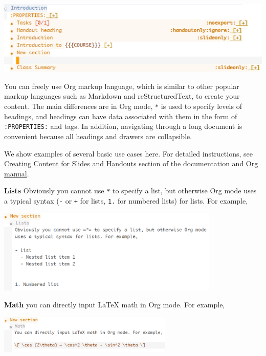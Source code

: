\documentclass[10pt,article]{article}
\begin{document}
\begin{center}
\includegraphics[height=3.5cm]{../../../Assets/Images/Org-Teaching/Quickstart_Lecture-Editing_New_Section.png}
\end{center}

You can freely use Org markup language, which is similar to other popular
markup languages such as Markdown and reStructuredText, to create your
content. The main differences are in Org mode, \texttt{*} is used to specify levels
of headings, and headings can have data associated with them in the form of
\texttt{:PROPERTIES:} and tags. In addition, navigating through a long document is 
convenient because all headings and drawers are collapsible. 

We show examples of several basic use cases here. For detailed instructions,
see \href{https://joonro.github.io/Org-Coursepack/Lectures/04\%2520Creating\%2520Content\%2520for\%2520Slides\%2520and\%2520Handouts.html}{Creating Content for Slides and Handouts} section of the documentation and
\href{https://orgmode.org/manual/index.html}{Org manual}.

\textbf{Lists} Obviously you cannot use \texttt{*} to specify a list, but otherwise Org mode
uses a typical syntax (\texttt{-} or \texttt{+} for lists, \texttt{1.} for numbered lists) for
lists. For example,

\begin{center}
\includegraphics[height=4cm]{../../../Assets/Images/Org-Teaching/Quickstart_Lecture-Editing_Lists.png}
\end{center}

\textbf{Math} you can directly input \LaTeX{} math in Org mode. For example,

\begin{center}
\includegraphics[height=1.8cm]{../../../Assets/Images/Org-Teaching/Quickstart_Lecture-Editing_Math.png}
\end{center}
\end{document}
